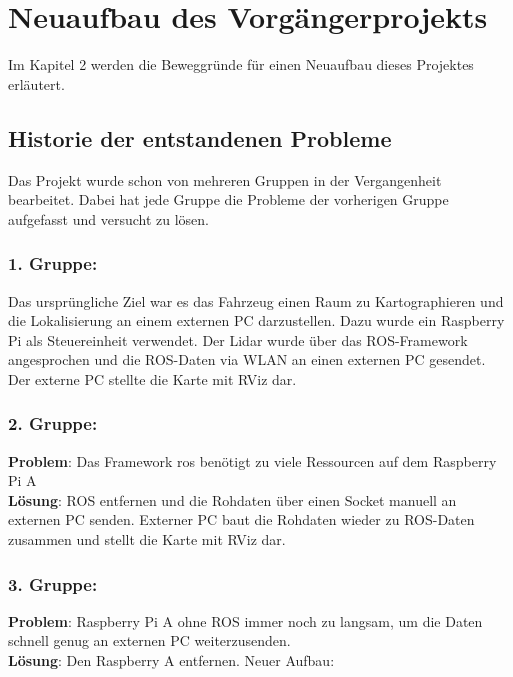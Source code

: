 

\chapter{Neuaufbau des Vorgängerprojekts}

Im Kapitel 2 werden die Beweggründe für einen Neuaufbau dieses Projektes erläutert.




\section{Historie der entstandenen Probleme}

Das Projekt wurde schon von mehreren Gruppen in der Vergangenheit bearbeitet. Dabei hat jede Gruppe die Probleme der vorherigen Gruppe aufgefasst und versucht zu lösen. 

\subsection*{1. Gruppe:} 

Das ursprüngliche Ziel war es das Fahrzeug einen Raum zu Kartographieren und die Lokalisierung an einem externen PC darzustellen. Dazu wurde ein Raspberry Pi als Steuereinheit verwendet. Der Lidar wurde über das ROS-Framework angesprochen und die ROS-Daten via WLAN an einen externen PC gesendet. Der externe PC stellte die Karte mit RViz dar.

\subsection*{2. Gruppe:} 

\textbf{Problem}: Das Framework \acrfull{ros} benötigt zu viele Ressourcen auf dem Raspberry Pi A\\
\textbf{Lösung}: ROS entfernen und die Rohdaten über einen Socket manuell an externen PC senden. Externer PC baut die Rohdaten wieder zu ROS-Daten zusammen und stellt die Karte mit RViz dar.

\subsection*{3. Gruppe:} 

\textbf{Problem}: Raspberry Pi A ohne ROS immer noch zu langsam, um die Daten schnell genug an externen PC weiterzusenden.\\
\textbf{Lösung}: Den Raspberry A entfernen. Neuer Aufbau:

